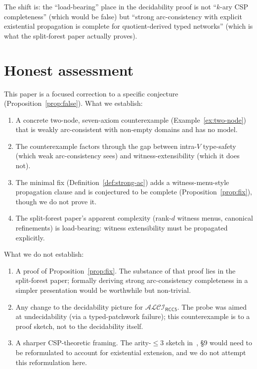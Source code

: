 \documentclass[11pt]{article}
\theoremstyle{definition}
\theoremstyle{remark}
\newcommand{\ALCIRCC}[1]{\mathcal{ALCI}_{\mathsf{RCC#1}}}
\begin{document}
The shift is: the ``load-bearing'' place in the decidability proof
is not ``$k$-ary CSP completeness'' (which would be false) but
``strong arc-consistency with explicit existential propagation is
complete for quotient-derived typed networks'' (which is what the
split-forest paper actually proves).

\section{Honest assessment}
\label{sec:honest}

This paper is a focused correction to a specific conjecture
(Proposition~\ref{prop:false}).  What we establish:
\begin{enumerate}
  \item A concrete two-node, seven-axiom counterexample
    (Example~\ref{ex:two-node}) that is weakly arc-consistent with
    non-empty domains and has no model.
  \item The counterexample factors through the gap between
    intra-$V$ type-safety (which weak arc-consistency sees) and
    witness-extensibility (which it does not).
  \item The minimal fix (Definition~\ref{def:strong-ac}) adds a
    witness-menu-style propagation clause and is conjectured to be
    complete (Proposition~\ref{prop:fix}), though we do not prove
    it.
  \item The split-forest paper's apparent complexity
    (rank-$d$ witness menus, canonical refinements) is load-bearing:
    witness extensibility must be propagated explicitly.
\end{enumerate}

What we do not establish:
\begin{enumerate}
  \item A proof of Proposition~\ref{prop:fix}.  The substance of that
    proof lies in the split-forest paper; formally deriving strong
    arc-consistency completeness in a simpler presentation would be
    worthwhile but non-trivial.
  \item Any change to the decidability picture for $\ALCIRCC{5}$.
    The probe was aimed at undecidability (via a typed-patchwork
    failure); this counterexample is to a proof sketch, not to the
    decidability itself.
  \item A sharper CSP-theoretic framing.  The arity-$\leq 3$ sketch
    in~\cite{PatchworkProbe}, \S9 would need to be reformulated to
    account for existential extension, and we do not attempt this
    reformulation here.
\end{enumerate}
\end{document}

